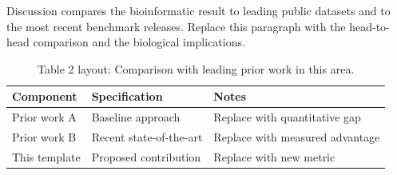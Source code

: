 
Discussion compares the bioinformatic result to leading public datasets and to the most recent benchmark releases. Replace this paragraph with the head-to-head comparison and the biological implications.

\begin{table}[H]
\caption{Table 2 layout: Comparison with leading prior work in this area.}
\label{tab:discussion_compare}
\centering
\begin{tabular}{>{\raggedright\arraybackslash}p{3.4cm} >{\raggedright\arraybackslash}p{4.6cm} >{\raggedright\arraybackslash}p{5.4cm}}
\toprule
\textbf{Component} & \textbf{Specification} & \textbf{Notes} \\
\midrule
  Prior work A & Baseline approach & Replace with quantitative gap \\
  Prior work B & Recent state-of-the-art & Replace with measured advantage \\
  This template & Proposed contribution & Replace with new metric \\
\bottomrule
\end{tabular}
\end{table}
